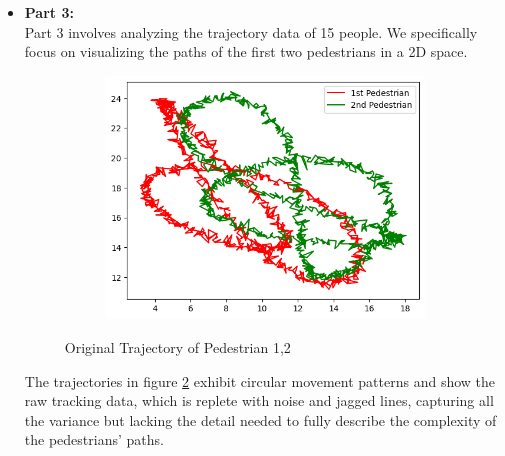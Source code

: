 \begin{itemize}
\item \textbf{Part 3:} \\
Part 3 involves analyzing the trajectory data of 15 people. We specifically focus on visualizing the paths of the first two pedestrians in a 2D space.

\begin{figure}[H]
    \centering
    \begin{subfigure}[b]{0.8\textwidth}
        \centering
        \includegraphics[width=\textwidth]{images/ex3task1-3-1.png}
        
        \label{fig:original_trajectory_pedestrians}
    \end{subfigure}
    \caption{Original Trajectory of Pedestrian 1,2}
    \label{fig:part3-1}
\end{figure}


The trajectories in figure \ref{fig:part3-1} exhibit circular movement patterns and show the raw tracking data, which is replete with noise and jagged lines, capturing all the variance but lacking the detail needed to fully describe the complexity of the pedestrians' paths.


\end{itemize}
